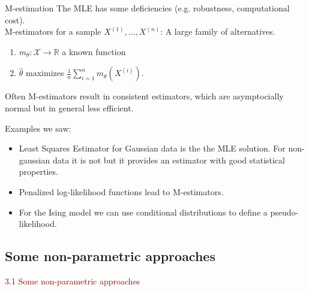 \documentclass[dvipsnames,aspectratio=169]{beamer} %
\newcommand{\R}{\mathbb{R}}
\newcommand{\cX}{\mathcal{X}}
\begin{document}
\begin{frame}{M-estimation}
	The MLE has some deficiencies (e.g. robustness, computational cost). \\[.3cm]
	\alert{M-estimators for a sample $X^{(1)},\ldots, X^{(n)}$}: A large family of alternatives.
	\begin{enumerate}
		\item $m_\theta:\cX\to \R$ a known function
		\item $\hat\theta$ maximizes $\frac{1}{n}\sum_{i=1}^n m_\theta(X^{(i)})$.
	\end{enumerate}
	
	Often M-estimators result in consistent estimators, which are asymptocially normal but in general less efficient.
	\begin{exampleblock}{Examples we saw:}
		\begin{itemize}
			\item Least Squares Estimator for Gaussian data is the the MLE solution. For non-gaussian data it is not but it provides an estimator with good statistical properties. 
			\item Penalized log-likelihood functions lead to M-estimators. 
			\item For the Ising model we can use conditional distributions to define a pseudo-likelihood. 
		\end{itemize}
	\end{exampleblock}
\end{frame}

\subsection{Some non-parametric approaches}

\begin{frame}{}
\begin{center}
	{\huge \textcolor{DarkRed}{3.1 Some non-parametric approaches}}
\end{center}
\end{frame}
\end{document}
